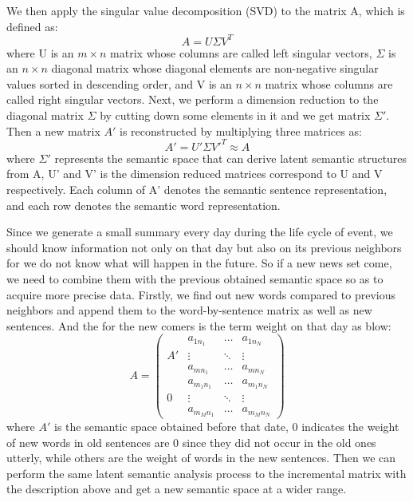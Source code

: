 \documentclass[runningheads,a4paper]{llncs}
\begin{document}
We then apply the singular value decomposition (SVD) to the matrix A, which is defined as:
\begin{equation}
A = U \Sigma V^T
\end{equation}
where U is an $m×n$ matrix whose columns are called left singular vectors, $\Sigma$ is an $n×n$ diagonal matrix whose diagonal elements are non-negative singular values sorted in descending order, and V is an $n×n$ matrix whose columns are called right singular vectors.
Next, we perform a dimension reduction to the diagonal matrix $\Sigma$ by cutting down some elements in it and we get matrix $\Sigma '$. Then a new matrix $A'$ is reconstructed by multiplying three matrices as:
\begin{equation}
A' = U' \Sigma V'^T \approx A
\end{equation}
 where $\Sigma'$ represents the semantic space that can derive latent semantic structures from A, U' and V' is the dimension reduced matrices correspond to U and V respectively. Each column of A' denotes the semantic sentence representation, and each row denotes the semantic word representation.

Since we generate a small summary every day during the life cycle of event, we should know information not only on that day but also on its previous neighbors for we do not know what will happen in the future. So if a new news set come, we need to combine them with the previous obtained semantic space so as to acquire more precise data. Firstly, we find out new words compared to previous neighbors and append them to the word-by-sentence matrix as well as new sentences. And the   for the new comers is the term weight on that day as blow: 
\begin{displaymath}
A =  \left( \begin{array}{cccc}
				&	a_{1n_1}	 &	 \ldots 	& a_{1n_N} 	\\
A'				& 	\vdots 	&	\ddots 	& \vdots 		\\
				& 	a_{mn_1} & 	\ldots 	& a_{mn_N}	\\

				& a_{m_1n_1} & 	\ldots 	& a_{m_1n_N} \\
0				& 	\vdots 	& 	\ddots 	& \vdots 		\\
				& a_{m_Mn_1} &   \ldots 	&a_{m_Mn_N}
\end{array}\right)
\end{displaymath}
where $A'$ is the semantic space obtained before that date, $0$ indicates the weight of new words in old sentences are 0 since they did not occur in the old ones utterly, while others are the weight of words in the new sentences.  
Then we can perform the same latent semantic analysis process to the incremental matrix with the description above and get a new semantic space at a wider range.
\end{document}
